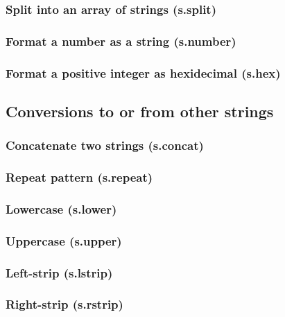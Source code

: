 \documentclass{article}
\theoremstyle{definition}
\begin{document}
\subsubsection{Split into an array of strings (s.split)}

\subsubsection{Format a number as a string (s.number)}

\subsubsection{Format a positive integer as hexidecimal (s.hex)}

\subsection{Conversions to or from other strings}

\subsubsection{Concatenate two strings (s.concat)}

\subsubsection{Repeat pattern (s.repeat)}

\subsubsection{Lowercase (s.lower)}

\subsubsection{Uppercase (s.upper)}

\subsubsection{Left-strip (s.lstrip)}

\subsubsection{Right-strip (s.rstrip)}
\end{document}
